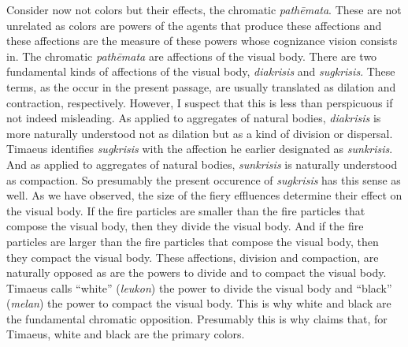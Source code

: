 Consider now not colors but their effects, the chromatic \emph{pathēmata}. These are not unrelated as colors are powers of the agents that produce these affections and these affections are the measure of these powers whose cognizance vision consists in. The chromatic \emph{pathēmata} are affections of the visual body. There are two fundamental kinds of affections of the visual body, \emph{diakrisis} and \emph{sugkrisis}. These terms, as the occur in the present passage, are usually translated as dilation and contraction, respectively. However, I suspect that this is less than perspicuous if not indeed misleading. As applied to aggregates of natural bodies, \emph{diakrisis} is more naturally understood not as dilation but as a kind of division or dispersal. Timaeus identifies \emph{sugkrisis} with the affection he earlier designated as \emph{sunkrisis}. And as applied to aggregates of natural bodies, \emph{sunkrisis} is naturally understood as compaction. So presumably the present occurence of \emph{sugkrisis} has this sense as well. As we have observed, the size of the fiery effluences determine their effect on the visual body. If the fire particles are smaller than the fire particles that compose the visual body, then they divide the visual body. And if the fire particles are larger than the fire particles that compose the visual body, then they compact the visual body. These affections, division and compaction, are naturally opposed as are the powers to divide and to compact the visual body. Timaeus calls ``white'' (\emph{leukon}) the power to divide the visual body and ``black'' (\emph{melan}) the power to compact the visual body. This is why white and black are the fundamental chromatic opposition. Presumably this is why \citet[480--1]{Taylor:1928qb} claims that, for Timaeus, white and black are the primary colors. 

